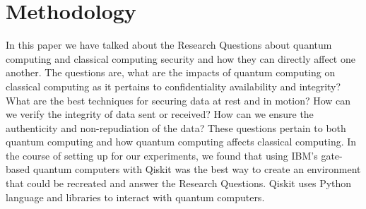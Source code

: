 \documentclass[sigconf]{acmart}
\begin{document}
\section{Methodology}
In this paper we have talked about the Research Questions about quantum computing and classical computing security and how they can directly affect one another.  The questions are, what are the impacts of quantum computing on classical computing as it pertains to confidentiality availability and integrity? What are the best techniques for securing data at rest and in motion? How can we verify the integrity of data sent or received? How can we ensure the authenticity and non-repudiation of the data? These questions pertain to both quantum computing and how quantum computing affects classical computing.  In the course of setting up for our experiments, we found that using IBM’s gate-based quantum computers with Qiskit was the best way to create an environment that could be recreated and answer the Research Questions. Qiskit uses Python language and libraries to interact with quantum computers.
\end{document}
